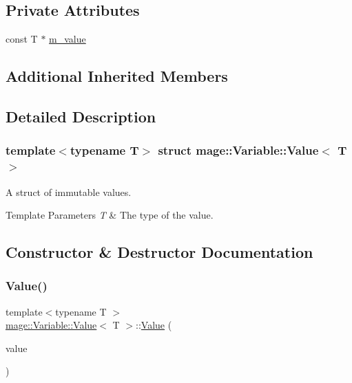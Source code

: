 \subsection*{Private Attributes}
\begin{DoxyCompactItemize}
\item 
const T $\ast$ \hyperlink{structmage_1_1_variable_1_1_value_aa15243b8811b108a0c7bff05456e377c}{m\+\_\+value}
\end{DoxyCompactItemize}
\subsection*{Additional Inherited Members}


\subsection{Detailed Description}
\subsubsection*{template$<$typename T$>$\newline
struct mage\+::\+Variable\+::\+Value$<$ T $>$}

A struct of immutable values. 
\begin{DoxyTemplParams}{Template Parameters}
{\em T} & The type of the value. \\
\hline
\end{DoxyTemplParams}


\subsection{Constructor \& Destructor Documentation}
\hypertarget{structmage_1_1_variable_1_1_value_a1e29cc5eaeb8356a11a1eca0232cf162}{}\label{structmage_1_1_variable_1_1_value_a1e29cc5eaeb8356a11a1eca0232cf162} 
\subsubsection{\texorpdfstring{Value()}{Value()}\hspace{0.1cm}{\footnotesize\ttfamily [1/2]}}
{\footnotesize\ttfamily template$<$typename T $>$ \\
\hyperlink{structmage_1_1_variable_1_1_value}{mage\+::\+Variable\+::\+Value}$<$ T $>$\+::\hyperlink{structmage_1_1_variable_1_1_value}{Value} (\begin{DoxyParamCaption}\item[{const T $\ast$}]{value }\end{DoxyParamCaption})}

